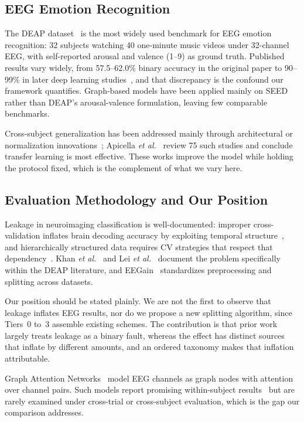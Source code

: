 \documentclass[conference,a4paper]{IEEEtran}
\begin{document}
\subsection{EEG Emotion Recognition}

The DEAP dataset~\cite{koelstra2012} is the most widely used benchmark for EEG emotion recognition: 32 subjects watching 40 one-minute music videos under 32-channel EEG, with self-reported arousal and valence (1--9) as ground truth. Published results vary widely, from 57.5--62.0\% binary accuracy in the original paper to 90--99\% in later deep learning studies~\cite{craik2019}, and that discrepancy is the confound our framework quantifies. Graph-based models have been applied mainly on SEED~\cite{zhong2020, zheng2015} rather than DEAP's arousal-valence formulation, leaving few comparable benchmarks.

Cross-subject generalization has been addressed mainly through architectural or normalization innovations~\cite{fdez2021, li2018ijcai, du2022, ning2021}; Apicella \textit{et al.}~\cite{apicella2024} review 75 such studies and conclude transfer learning is most effective. These works improve the model while holding the protocol fixed, which is the complement of what we vary here.

\subsection{Evaluation Methodology and Our Position}

Leakage in neuroimaging classification is well-documented: improper cross-validation inflates brain decoding accuracy by exploiting temporal structure~\cite{varoquaux2017}, and hierarchically structured data requires CV strategies that respect that dependency~\cite{roberts2017}. Khan \textit{et al.}~\cite{khan2025} and Lei \textit{et al.}~\cite{lei2025} document the problem specifically within the DEAP literature, and EEGain~\cite{kukhilava2025} standardizes preprocessing and splitting across datasets.

Our position should be stated plainly. We are not the first to observe that leakage inflates EEG results, nor do we propose a new splitting algorithm, since Tiers~0 to~3 assemble existing schemes. The contribution is that prior work largely treats leakage as a binary fault, whereas the effect has distinct sources that inflate by different amounts, and an ordered taxonomy makes that inflation attributable.

Graph Attention Networks~\cite{velickovic2018} model EEG channels as graph nodes with attention over channel pairs. Such models report promising within-subject results~\cite{zhong2020} but are rarely examined under cross-trial or cross-subject evaluation, which is the gap our comparison addresses.
\end{document}
